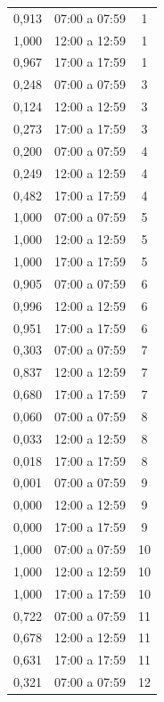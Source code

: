 \vspace{0.5cm}
\centering
\tabletail{\hline}
\begin{supertabular}{ccc}
0,913 & 07:00 a 07:59 & 1 \\
1,000 & 12:00 a 12:59 & 1 \\
0,967 & 17:00 a 17:59 & 1 \\
0,248 & 07:00 a 07:59 & 3 \\
0,124 & 12:00 a 12:59 & 3 \\
0,273 & 17:00 a 17:59 & 3 \\
0,200 & 07:00 a 07:59 & 4 \\
0,249 & 12:00 a 12:59 & 4 \\
0,482 & 17:00 a 17:59 & 4 \\
1,000 & 07:00 a 07:59 & 5 \\
1,000 & 12:00 a 12:59 & 5 \\
1,000 & 17:00 a 17:59 & 5 \\
0,905 & 07:00 a 07:59 & 6 \\
0,996 & 12:00 a 12:59 & 6 \\
0,951 & 17:00 a 17:59 & 6 \\
0,303 & 07:00 a 07:59 & 7 \\
0,837 & 12:00 a 12:59 & 7 \\
0,680 & 17:00 a 17:59 & 7 \\
0,060 & 07:00 a 07:59 & 8 \\
0,033 & 12:00 a 12:59 & 8 \\
0,018 & 17:00 a 17:59 & 8 \\
0,001 & 07:00 a 07:59 & 9 \\
0,000 & 12:00 a 12:59 & 9 \\
0,000 & 17:00 a 17:59 & 9 \\
1,000 & 07:00 a 07:59 & 10 \\
1,000 & 12:00 a 12:59 & 10 \\
1,000 & 17:00 a 17:59 & 10 \\
0,722 & 07:00 a 07:59 & 11 \\
0,678 & 12:00 a 12:59 & 11 \\
0,631 & 17:00 a 17:59 & 11 \\
0,321 & 07:00 a 07:59 & 12 \\

\end{supertabular}
